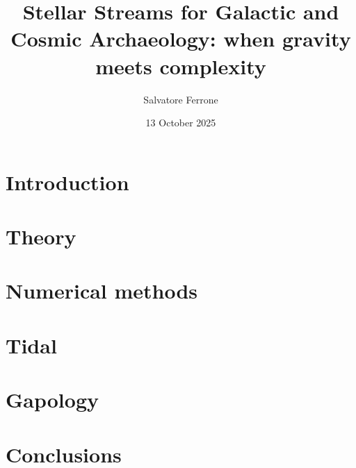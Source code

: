 \documentclass[a4paper,12pt,twoside]{book}
\title{Stellar Streams for Galactic and Cosmic Archaeology: when gravity meets complexity}
\institute{Observatoire de Paris-PSL, LIRA, UMR 8254 CNRS}
\author{Salvatore Ferrone}
\date{13 October 2025}
\begin{document}
\pslcover{}

\frontmatter
\AddResumeAbstract %

\begin{singlespace} %
 {}\adjustmtc
\tableofcontents\newpage
\renewcommand{\listfigurename}{List of Figures}
\listoffigures\adjustmtc %
\listoftables\adjustmtc %
\end{singlespace}

\mainmatter
\setcounter{page}{1}
\chapter{Introduction}
% 

\chapter{Theory}
% 

\chapter{Numerical methods}
% 

\chapter{Tidal}
% 

\chapter{Gapology}
% 

\chapter{Conclusions}
% 

\backmatter
\appendix





\begin{singlespace}
\setlength{}
\small\printbibliography[heading=bibintoc,title=Bibliography]
\end{singlespace}
\end{document}
